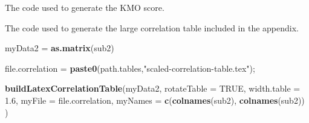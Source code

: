 \documentclass[]{article}
\newenvironment{Shaded}{\begin{snugshade}}{\end{snugshade}}
\newcommand{\CommentTok}[1]{\textcolor[rgb]{0.56,0.35,0.01}{\textit{#1}}}
\newcommand{\DataTypeTok}[1]{\textcolor[rgb]{0.13,0.29,0.53}{#1}}
\newcommand{\DecValTok}[1]{\textcolor[rgb]{0.00,0.00,0.81}{#1}}
\newcommand{\FloatTok}[1]{\textcolor[rgb]{0.00,0.00,0.81}{#1}}
\newcommand{\KeywordTok}[1]{\textcolor[rgb]{0.13,0.29,0.53}{\textbf{#1}}}
\newcommand{\NormalTok}[1]{#1}
\newcommand{\OperatorTok}[1]{\textcolor[rgb]{0.81,0.36,0.00}{\textbf{#1}}}
\newcommand{\OtherTok}[1]{\textcolor[rgb]{0.56,0.35,0.01}{#1}}
\newcommand{\StringTok}[1]{\textcolor[rgb]{0.31,0.60,0.02}{#1}}
\begin{document}
The code used to generate the KMO score.

\begin{Shaded}
\end{Shaded}

The code used to generate the large correlation table included in the
appendix.

\begin{Shaded}
\begin{Highlighting}[]
\NormalTok{myData2 =}\StringTok{ }\KeywordTok{as.matrix}\NormalTok{(sub2)}

\NormalTok{file.correlation =}\StringTok{ }\KeywordTok{paste0}\NormalTok{(path.tables,}\StringTok{"scaled{-}correlation{-}table.tex"}\NormalTok{);}

\KeywordTok{buildLatexCorrelationTable}\NormalTok{(myData2, }
  \DataTypeTok{rotateTable =} \OtherTok{TRUE}\NormalTok{,}
  \DataTypeTok{width.table =} \FloatTok{1.6}\NormalTok{,}
  \DataTypeTok{myFile =}\NormalTok{ file.correlation,}
  \DataTypeTok{myNames =} \KeywordTok{c}\NormalTok{(}\KeywordTok{colnames}\NormalTok{(sub2), }\KeywordTok{colnames}\NormalTok{(sub2))}
\NormalTok{)}
\end{Highlighting}
\end{Shaded}







\newpage
\theendnotes

\newpage
\begin{auxmulticols}{1}
\singlespacing 


\end{auxmulticols}

\newpage
{
\hypersetup{linkcolor=black}
\setcounter{tocdepth}{3}
\tableofcontents
}
\end{document}
